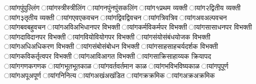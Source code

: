 \छायांग{पुं}{पुल्लिंग} %
\छायांग{स्त्री}{स्त्रीलिंग} %
\छायांग{नपुं}{नपुंसकलिंग} %
\छायांग{१}{प्रथम व्यक्ती} %
\छायांग{२}{द्वितीय व्यक्ती} %
\छायांग{३}{तृतीय व्यक्ती} %
\छायांग{एव}{एकवचन} %
\छायांग{द्विव}{द्विवचन} %
\छायांग{त्रिव}{त्रिव} %
\छायांग{अव}{अल्पवचन} %
\छायांग{बव}{बहुवचन} %
\छायांग{अवि}{अभिधानपर विभक्ती} %
\छायांग{कर्मवि}{कर्मपर विभक्ती} %
\छायांग{सा}{साधनपर विभक्ती} %
\छायांग{दावि}{दानपर विभक्ती} %
\छायांग{वियो}{वियोगपर विभक्ती} %
\छायांग{संयो}{संबंधयोजक विभक्ती} %
\छायांग{अधि}{अधिकरण विभक्ती} %
\छायांग{संबो}{संबोधन विभक्ती} %
\छायांग{साह}{साहचर्यदर्शक विभक्ती} %
\छायांग{कवि}{कर्तृत्वपर विभक्ती} %
\छायांग{आवि}{आगत विभक्ती} %
\छायांग{साक्रि}{साहाय्यक क्रियापद} %
\छायांग{गणक}{गणक} %
\छायांग{भूत}{भूतकाळ} %
\छायांग{वर्त}{वर्तमान काळ} %
\छायांग{भवि}{भविष्यकाळ} %
\छायांग{पू}{पूर्ण} %
\छायांग{अपू}{अपूर्ण} %
\छायांग{नि}{नित्य} %
\छायांग{अखं}{अखंडित} %
\छायांग{क्र}{क्रमिक} %
\छायांग{अक्र}{अक्रमिक} %